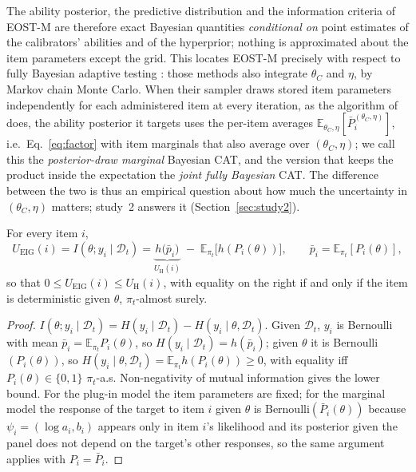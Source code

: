 The ability posterior, the predictive distribution and the information criteria of
EOST-M are therefore exact Bayesian quantities \emph{conditional on} point estimates of
the calibrators' abilities and of the hyperprior; nothing is approximated about the item
parameters except the grid. This locates EOST-M precisely with respect to fully Bayesian
adaptive testing \citep{vanderlinden2020fast,fink2025accounting}: those methods also
integrate $\theta_C$ and $\eta$, by Markov chain Monte Carlo. When their sampler draws
stored item parameters independently for each administered item at every iteration, as
the algorithm of \citet{vanderlinden2020fast} does, the ability posterior it targets uses
the per-item averages $\mathbb E_{\theta_C,\eta}[\bar P_i^{(\theta_C,\eta)}]$, i.e.\
Eq.~\eqref{eq:factor} with item marginals that also average over $(\theta_C,\eta)$; we call
this the \emph{posterior-draw marginal} Bayesian CAT, and the version that keeps the product
inside the expectation the \emph{joint fully Bayesian} CAT. The
difference between the two is thus an empirical question about how much the uncertainty
in $(\theta_C,\eta)$ matters; study~2 answers it (Section~\ref{sec:study2}).

\begin{proposition}\label{prop:decomp}
For every item $i$,
\begin{equation}
U_{\mathrm{EIG}}(i)= I(\theta;y_i\mid\mathcal D_t)
= \underbrace{h\big(\bar p_i\big)}_{U_{\mathrm{H}}(i)} \;-\; \mathbb E_{\pi_t}\big[h(P_i(\theta))\big],
\qquad \bar p_i=\mathbb E_{\pi_t}[P_i(\theta)],
\end{equation}
so that $0\le U_{\mathrm{EIG}}(i)\le U_{\mathrm H}(i)$, with equality on the right
if and only if the item is deterministic given $\theta$, $\pi_t$-almost surely.
\end{proposition}

\begin{proof}
$I(\theta;y_i\mid\mathcal D_t)=H(y_i\mid\mathcal D_t)-H(y_i\mid\theta,\mathcal D_t)$.
Given $\mathcal D_t$, $y_i$ is Bernoulli with mean $\bar p_i=\mathbb E_{\pi_t}P_i(\theta)$,
so $H(y_i\mid\mathcal D_t)=h(\bar p_i)$; given $\theta$ it is Bernoulli$(P_i(\theta))$,
so $H(y_i\mid\theta,\mathcal D_t)=\mathbb E_{\pi_t}h(P_i(\theta))\ge0$, with equality iff
$P_i(\theta)\in\{0,1\}$ $\pi_t$-a.s. Non-negativity of mutual information gives
the lower bound. For the plug-in model the item parameters are fixed; for the
marginal model the response of the target to item $i$ given $\theta$ is
Bernoulli$(\bar P_i(\theta))$ because $\psi_i=(\log a_i,b_i)$ appears only in
item $i$'s likelihood and its posterior given the panel does not depend on the
target's other responses, so the same argument applies with $P_i=\bar P_i$.
\end{proof}

